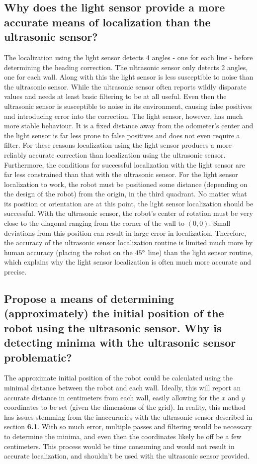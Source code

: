 \documentclass[11pt]{article}
\begin{document}
\subsection{Why does the light sensor provide a more accurate means of localization than the
ultrasonic sensor?}
\par The localization using the light sensor detects 4 angles - one for each line - before
determining the heading correction. The ultrasonic sensor only detects 2 angles, one for each wall.
Along with this the light sensor is less susceptible to noise than the ultrasonic sensor. While the
ultrasonic sensor often reports wildly disparate values and needs at least basic filtering to be at
all useful. Even then the ultrasonic sensor is susceptible to noise in its environment, causing
false positives and introducing error into the correction. The light sensor, however, has much more
stable behaviour. It is a fixed distance away from the odometer's center and the light sensor is far
less prone to false positives and does not even require a filter. For these reasons localization
using the light sensor produces a more reliably accurate correction than localization using the
ultrasonic sensor. Furthermore, the conditions for successful localization with the light sensor are
far less constrained than that with the ultrasonic sensor. For the light sensor localization to
work, the robot must be positioned some distance (depending on the design of the robot) from the
origin, in the third quadrant. No matter what its position or orientation are at this point, the
light sensor localization should be successful. With the ultrasonic sensor, the robot's center of
rotation must be very close to the diagonal ranging from the corner of the wall to $(0,0)$. Small
deviations from this position can result in large error in localization. Therefore, the accuracy of
the ultrasonic sensor localization routine is limited much more by human accuracy (placing the robot
on the $45 \degree$ line) than the light sensor routine, which explains why the light sensor
localization is often much more accurate and precise.
\subsection{Propose a means of determining (approximately) the initial position of the robot using
the ultrasonic sensor. Why is detecting minima with the ultrasonic sensor problematic?}
\par The approximate initial position of the robot could be calculated using the minimal distance
between the robot and each wall. Ideally, this will report an accurate distance in centimeters from
each wall, easily allowing for the $x$ and $y$ coordinates to be set (given the dimensions of the grid).
In reality, this method has issues
stemming from the inaccuracies with the ultrasonic sensor described in section \textbf{6.1}. With so
much error, multiple passes and filtering would be necessary to determine the minima, and even then
the coordinates likely be off be a few centimeters. This process would be time consuming and would
not result in accurate localization, and shouldn't be used with the ultrasonic sensor provided.
\end{document}

